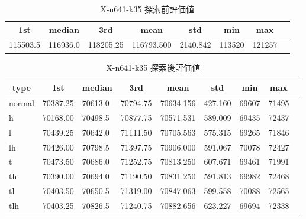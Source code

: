 \begin{table}[htbp]
    \caption{X-n641-k35 探索前評価値}
    \begin{tabular}{|l|l|l|l|l|l|l|l|}\hline
    \multicolumn{1}{|c|}{\textbf{1st}}
    &\multicolumn{1}{c|}{\textbf{median}}
    &\multicolumn{1}{c|}{\textbf{3rd}}
    &\multicolumn{1}{c|}{\textbf{mean}}
    &\multicolumn{1}{c|}{\textbf{std}}
    &\multicolumn{1}{c|}{\textbf{min}}
    &\multicolumn{1}{c|}{\textbf{max}}\\\hline
	115503.5 & 116936.0 & 118205.25 & 116793.500 & 2140.842 & 113520 & 121257\\\hline
	\end{tabular}
\end{table}
\begin{table}[htbp]
    \caption{X-n641-k35 探索後評価値}
    \begin{tabular}{|l|l|l|l|l|l|l|l|l|}\hline
    \multicolumn{1}{|c|}{\textbf{type}}
    &\multicolumn{1}{|c|}{\textbf{1st}}
    &\multicolumn{1}{c|}{\textbf{median}}
    &\multicolumn{1}{c|}{\textbf{3rd}}
    &\multicolumn{1}{c|}{\textbf{mean}}
    &\multicolumn{1}{c|}{\textbf{std}}
    &\multicolumn{1}{c|}{\textbf{min}}
    &\multicolumn{1}{c|}{\textbf{max}}\\\hline
	normal & 70387.25 & 70613.0 & 70794.75 & 70634.156 & 427.160 & 69607 & 71495\\\hline
	h & 70168.00 & 70498.5 & 70877.75 & 70571.531 & 589.009 & 69435 & 72437\\\hline
	l & 70439.25 & 70642.0 & 71111.50 & 70705.563 & 575.315 & 69265 & 71846\\\hline
	lh & 70426.00 & 70798.5 & 71397.75 & 70906.000 & 591.067 & 70078 & 72427\\\hline
	t & 70473.50 & 70686.0 & 71252.75 & 70813.250 & 607.671 & 69461 & 71991\\\hline
	th & 70390.00 & 70694.0 & 71190.50 & 70831.250 & 591.813 & 69982 & 72468\\\hline
	tl & 70403.50 & 70650.5 & 71319.00 & 70847.063 & 599.558 & 70088 & 72565\\\hline
	tlh & 70403.25 & 70826.5 & 71240.75 & 70882.656 & 623.227 & 69694 & 72338\\\hline
	\end{tabular}
\end{table}
